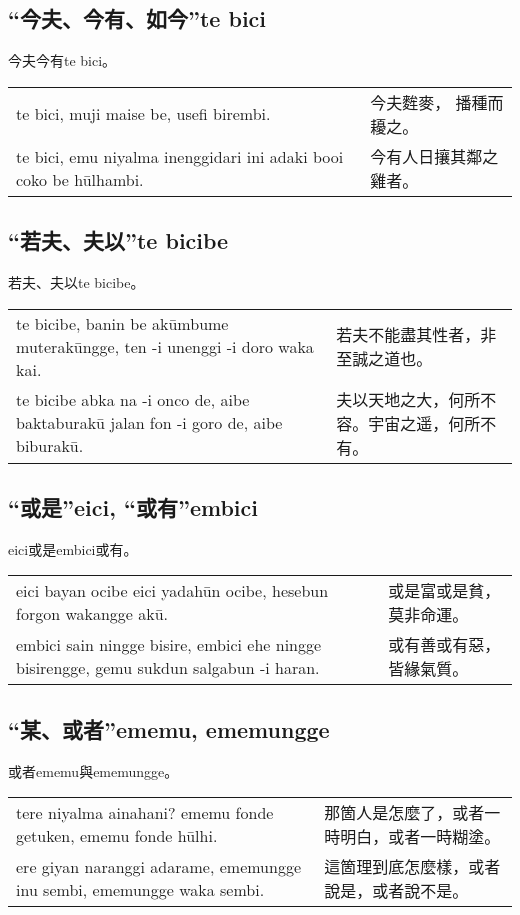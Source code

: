 \documentclass{article}
\begin{document}
\subsection{“今夫、今有、如今”te bici}
\noindent 今夫今有te bici。
\begin{center}
    \begin{tabularx}{\textwidth}{XX}
        te bici, muji maise be, usefi birembi. & 今夫麰麥， 播種而耰之。\\
        te bici, emu niyalma inenggidari ini adaki booi coko be h\={u}lhambi. & 今有人日攘其鄰之雞者。
    \end{tabularx}
\end{center}

\subsection{“若夫、夫以”te bicibe}
\noindent 若夫、夫以te bicibe。
\begin{center}
    \begin{tabularx}{\textwidth}{XX}
        te bicibe, banin be ak\={u}mbume muterak\={u}ngge, ten -i unenggi -i doro waka kai. & 若夫不能盡其性者，非至誠之道也。\\
        te bicibe abka na -i onco de, aibe baktaburak\={u} jalan fon -i goro de, aibe biburak\={u}. & 夫以天地之大，何所不容。宇宙之遥，何所不有。
    \end{tabularx}
\end{center}

\subsection{“或是”eici, “或有”embici}
\noindent eici或是embici或有。
\begin{center}
    \begin{tabularx}{\textwidth}{XX}
        eici bayan ocibe eici yadah\={u}n ocibe, hesebun forgon wakangge ak\={u}. & 或是富或是貧，莫非命運。\\
        embici sain ningge bisire, embici ehe ningge bisirengge, gemu sukdun salgabun -i haran. & 或有善或有惡，皆緣氣質。
    \end{tabularx}
\end{center}

\subsection{“某、或者”ememu, ememungge}
\noindent 或者ememu與ememungge。
\begin{center}
    \begin{tabularx}{\textwidth}{XX}
        tere niyalma ainahani? ememu fonde getuken, ememu fonde h\={u}lhi. & 那箇人是怎麼了，或者一時明白，或者一時糊塗。\\
        ere giyan naranggi adarame, ememungge inu sembi, ememungge waka sembi. & 這箇理到底怎麼樣，或者說是，或者說不是。
    \end{tabularx}
\end{center}
\end{document}
